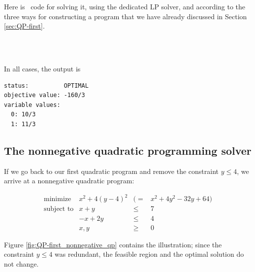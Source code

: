 Here is \cgal\ code for solving it, using the dedicated LP solver, and
according to the three ways for constructing a program that we have
already discussed in Section \ref{sec:QP-first}. 

\\
\\

In all cases, the output is
\begin{verbatim}
status:          OPTIMAL
objective value: -160/3
variable values:
  0: 10/3
  1: 11/3
\end{verbatim}

\subsection{The  nonnegative quadratic programming solver}
If we go back to our first quadratic program and
remove the constraint $y\leq 4$, we arrive at a nonnegative quadratic
program: 

\[
\begin{array}{lrcl}
\mbox{minimize}       & x^2 + 4(y-4)^2 &(=& x^2 + 4y^2 - 32y + 64) \\
\mbox{subject to}     & x + y &\leq& 7 \\
                      & -x + 2y &\leq& 4 \\
                      & x,y &\geq& 0
\end{array}
\]

Figure \ref{fig:QP-first_nonnegative_qp} contains 
the illustration; since the constraint $y\leq 4$ was 
redundant, the feasible region and the optimal solution do 
not change. 

